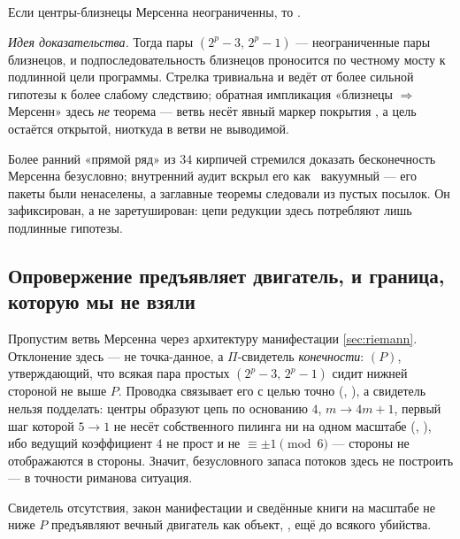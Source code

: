 \begin{theorem}\label{thm:twinLowersInfinite_of_mersenneTwins}
\green{}\; Если центры-близнецы Мерсенна неограниченны, то .
\end{theorem}

\emph{Идея доказательства.} Тогда пары $(2^p-3,\,2^p-1)$ --- неограниченные пары близнецов, и
подпоследовательность близнецов проносится по честному мосту к подлинной цели программы. Стрелка
тривиальна и ведёт от более сильной гипотезы к более слабому следствию; обратная импликация
«близнецы $\Rightarrow$ Мерсенн» здесь \emph{не} теорема --- ветвь несёт явный маркер покрытия
, а цель  остаётся \red{}
открытой, ниоткуда в ветви не выводимой.

\begin{remark}
Более ранний «прямой ряд» из $34$ кирпичей стремился доказать бесконечность Мерсенна безусловно;
внутренний аудит вскрыл его как \warn{}~вакуумный --- его пакеты  были ненаселены, а
заглавные теоремы следовали из пустых посылок. Он зафиксирован, а не заретуширован: цепи редукции
здесь потребляют лишь подлинные гипотезы.
\end{remark}

\subsection{Опровержение предъявляет двигатель, и граница, которую мы не взяли}

Пропустим ветвь Мерсенна через архитектуру манифестации \cref{sec:riemann}. Отклонение здесь ---
не точка-данное, а $\Pi$-свидетель \emph{конечности}: $(P)$,
утверждающий, что всякая пара простых $(2^p-3,\,2^p-1)$ сидит нижней стороной не выше $P$. Проводка
связывает его с целью точно (, \green{}), а
свидетель нельзя подделать: центры образуют цепь по основанию $4$, $m\to 4m+1$, первый шаг которой
$5\to 1$ не несёт собственного пилинга ни на одном масштабе
(, \green{}), ибо ведущий коэффициент $4$ не прост и не
$\equiv\pm1\pmod 6$ --- стороны не отображаются в стороны. Значит, безусловного запаса потоков здесь
не построить --- в точности риманова ситуация.

\begin{theorem}\label{thm:mersenneRefutation_carries_engine}
\green{}\; Свидетель отсутствия, закон манифестации  и сведённые книги
на масштабе не ниже $P$ предъявляют вечный двигатель как объект,
, ещё до всякого убийства.
\end{theorem}

